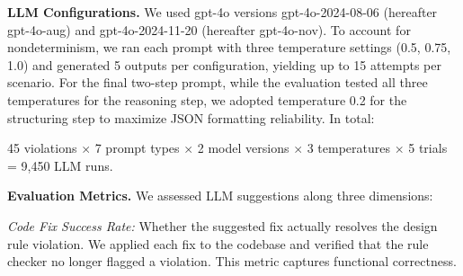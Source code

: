 \documentclass[conference]{IEEEtran}
\begin{document}
\textbf{LLM Configurations.} We used gpt-4o versions gpt-4o-2024-08-06 (hereafter gpt-4o-aug) and gpt-4o-2024-11-20 (hereafter gpt-4o-nov). To account for nondeterminism, we ran each prompt with three temperature settings (0.5, 0.75, 1.0) and generated 5 outputs per configuration, yielding up to 15 attempts per scenario. For the final two-step prompt, while the evaluation tested all three temperatures for the reasoning step, we adopted temperature 0.2 for the structuring step to maximize JSON formatting reliability. In total:

45 violations $\times$ 7 prompt types $\times$ 2 model versions $\times$ 3 temperatures $\times$ 5 trials = 9,450 LLM runs.

\textbf{Evaluation Metrics.} We assessed LLM suggestions along three dimensions:

\textit{Code Fix Success Rate:} Whether the suggested fix actually resolves the design rule violation. We applied each fix to the codebase and verified that the rule checker no longer flagged a violation. This metric captures functional correctness.
\end{document}
